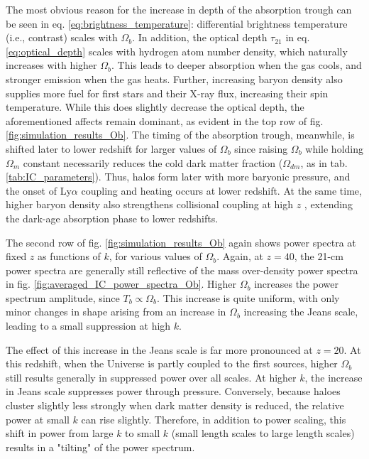 \documentclass[floats,floatfix,showpacs,amssymb,prd,superscriptaddress,nofootinbib]{revtex4-2} %
\begin{document}
The most obvious reason for the increase in depth of the absorption trough can be seen in eq. \ref{eq:brightness_temperature}: differential brightness temperature (i.e., contrast) scales with $\Omega_b$. In addition, the optical depth $\tau_{21}$ in eq. \ref{eq:optical_depth} scales with hydrogen atom number density, which naturally increases with higher $\Omega_b$. This leads to deeper absorption when the gas cools, and stronger emission when the gas heats. Further, increasing baryon density also supplies more fuel for first stars and their X-ray flux, increasing their spin temperature. While this does slightly decrease the optical depth, the aforementioned affects remain dominant, as evident in the top row of fig. \ref{fig:simulation_results_Ob}. The timing of the absorption trough, meanwhile, is shifted later to lower redshift for larger values of $\Omega_b$ since raising $\Omega_b$ while holding $\Omega_m$ constant necessarily reduces the cold dark matter fraction ($\Omega_{dm}$, as in tab. \ref{tab:IC_parameters}). Thus, halos form later with more baryonic pressure, and the onset of Ly$\alpha$ coupling and heating occurs at lower redshift. At the same time, higher baryon density also strengthens collisional coupling at high $z$ , extending the dark-age absorption phase to lower redshifts. 

The second row of fig. \ref{fig:simulation_results_Ob} again shows power spectra at fixed $z$ as functions of $k$, for various values of $\Omega_b$. Again, at $z = 40$, the 21-cm power spectra are generally still reflective of the mass over-density power spectra in fig. \ref{fig:averaged_IC_power_spectra_Ob}. Higher $\Omega_b$ increases the power spectrum amplitude, since $T_b \propto \Omega_b$.  This increase is quite uniform, with only minor changes in shape arising from an increase in $\Omega_b$ increasing the Jeans scale, leading to a small suppression at high $k$. 

The effect of this increase in the Jeans scale is far more pronounced at $z = 20$. At this redshift, when the Universe is partly coupled to the first sources, higher $\Omega_b$ still results generally in suppressed power over all scales. At higher $k$, the increase in Jeans scale suppresses power through pressure. Conversely, because haloes cluster slightly less strongly when dark matter density is reduced, the relative power at small $k$ can rise slightly. Therefore, in addition to power scaling, this shift in power from large $k$ to small $k$ (small length scales to large length scales) results in a "tilting" of the power spectrum.
\end{document}
